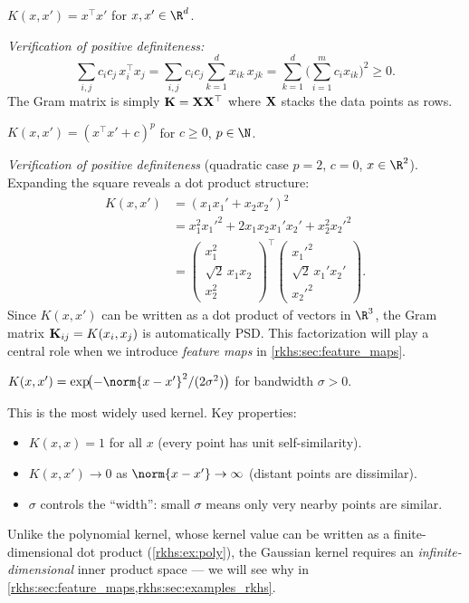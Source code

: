 \begin{notechapter}
\begin{example}
$K(x,x') = x^\top x'$ for $x, x' \in \R^d$.

\emph{Verification of positive definiteness:}
\[
\sum_{i,j} c_i c_j\, x_i^\top x_j = \sum_{i,j} c_i c_j
\sum_{k=1}^d x_{ik}\, x_{jk} = \sum_{k=1}^d
\biggl(\sum_{i=1}^m c_i x_{ik}\biggr)^{\!2} \geq 0.
\]
The Gram matrix is simply
$\mathbf{K} = \mathbf{X}\mathbf{X}^\top$ where $\mathbf{X}$ stacks
the data points as rows.
\end{example}

\begin{example}\label{rkhs:ex:poly}
$K(x,x') = (x^\top x' + c)^p$ for $c \geq 0$,
$p \in \N$.

\emph{Verification of positive definiteness} (quadratic
case $p = 2$, $c = 0$, $x \in \R^2$). Expanding the
square reveals a dot product structure:
\begin{align*}
K(x,x') &= (x_1 x_1' + x_2 x_2')^2 \\
&= x_1^2 {x_1'}^2 + 2 x_1 x_2 x_1' x_2'
  + x_2^2 {x_2'}^2 \\
&= \begin{pmatrix} x_1^2 \\ \sqrt{2}\, x_1 x_2
  \\ x_2^2 \end{pmatrix}^\top
\begin{pmatrix} {x_1'}^2 \\ \sqrt{2}\, x_1' x_2'
  \\ {x_2'}^2 \end{pmatrix}.
\end{align*}
Since $K(x,x')$ can be written as a dot product of
vectors in $\R^3$, the Gram matrix
$\mathbf{K}_{ij} = K(x_i,x_j)$ is automatically PSD.
This factorization will play a central role when we
introduce \emph{feature maps} in
\cref{rkhs:sec:feature_maps}.
\end{example}

\begin{example}
$K(x,x') = \exp\!\bigl(-\norm{x - x'}^2 /
(2\sigma^2)\bigr)$ for bandwidth $\sigma > 0$.

This is the most widely used kernel. Key properties:
\begin{itemize}
  \item $K(x,x) = 1$ for all $x$ (every point has
    unit self-similarity).
  \item $K(x,x') \to 0$ as $\norm{x - x'} \to \infty$
    (distant points are dissimilar).
  \item $\sigma$ controls the ``width'': small $\sigma$
    means only very nearby points are similar.
\end{itemize}
Unlike the polynomial kernel, whose kernel value can be
written as a finite-dimensional dot product (\cref{rkhs:ex:poly}),
the Gaussian kernel requires an
\emph{infinite-dimensional} inner product space --- we
will see why in \cref{rkhs:sec:feature_maps,rkhs:sec:examples_rkhs}.
\end{example}


\end{notechapter}
